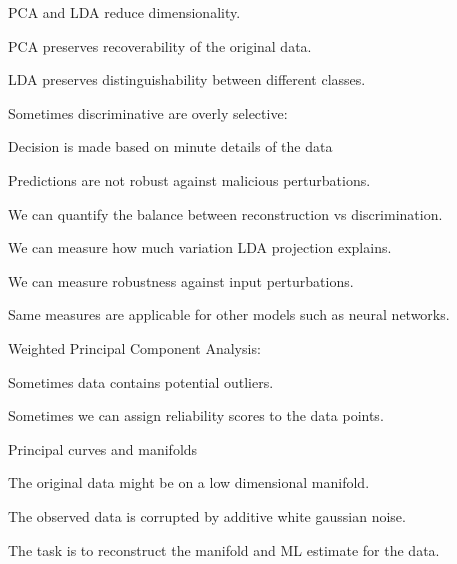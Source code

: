 \documentclass[landscape,footrule]{foils}
\begin{document}

\begin{triangles}
\item PCA and LDA reduce dimensionality.
\item PCA preserves recoverability of the original data.
\item LDA preserves distinguishability between different classes. \vspace*{1cm}     
\end{triangles}

Sometimes discriminative are overly selective:
\begin{triangles}
\item Decision is made based on minute details of the data
\item Predictions are not robust against malicious perturbations.\vspace*{1cm} 
\end{triangles}

We can quantify the balance between reconstruction vs discrimination. 
\begin{triangles}
\item We can measure how much variation LDA projection explains.
\item We can measure robustness against input perturbations. 
\item Same measures are applicable for other models such as neural networks.
\end{triangles} 







Weighted Principal Component Analysis:
\begin{triangles}
\item Sometimes data contains potential outliers.
\item Sometimes we can assign reliability scores to the data points. 
\end{triangles}\vspace*{1.0cm}

Principal curves and manifolds
\begin{triangles}
\item The original data might be on a low dimensional manifold. 
\item The observed data is corrupted by additive white gaussian noise. 
\item The task is to reconstruct the manifold and ML estimate for the data. 
\end{triangles}\vspace*{1.0cm}
\end{document}

